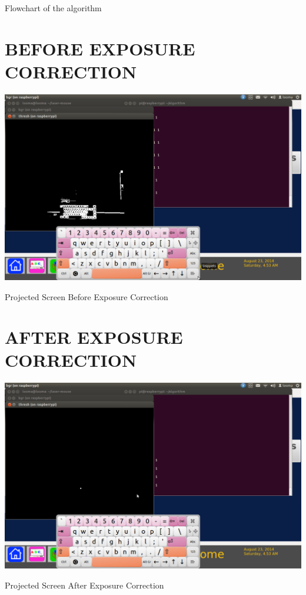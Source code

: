 \documentclass[12pt, a4paper]{article}
\begin{document}
\begin{appendices}
\begin{appendixfig}
\caption{Flowchart of the algorithm}
\end{appendixfig}

\newpage
\section{BEFORE EXPOSURE CORRECTION}
\begin{appendixfig}
\includegraphics[scale=0.30]{projector.png}
\caption{Projected Screen Before Exposure Correction}
\label{}
\end{appendixfig}
\newpage
\section{AFTER EXPOSURE CORRECTION}
\begin{appendixfig}
\includegraphics[scale=0.30]{projectorwithout.png}
\caption{Projected Screen After Exposure Correction}
\label{}
\end{appendixfig}
\end{appendices}
\end{document}
